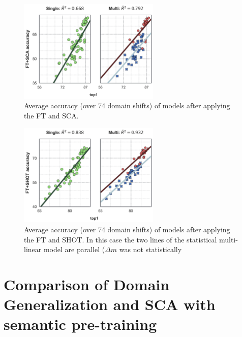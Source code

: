 \documentclass{article}
\begin{document}
\begin{figure}[h!]
\begin{center}
\includegraphics[width=0.6\textwidth]{images_lines/multilinear_FT_SCA.png}
\end{center}
\caption{Average accuracy (over 74 domain shifts) of models after applying the FT and SCA.}
\end{figure}


\begin{figure}[h!]
\begin{center}

\includegraphics[width=0.6\textwidth]{images_lines/multilinear_FT_shot.png}
\end{center}
\caption{Average accuracy (over 74 domain shifts) of models after applying the FT and SHOT. In this case the two lines of the statistical multi-linear model are parallel ($\Delta m$ was not statistically \label{fig:ft-shot-dgen}}
\end{figure}
\clearpage

\section{Comparison of Domain Generalization and SCA with semantic pre-training}
\label{semantictrain}
\end{document}

